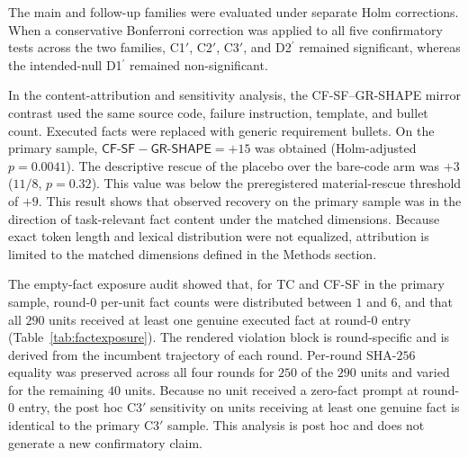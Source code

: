 \documentclass{article}
\numberwithin{equation}{section}  %
\newcommand{\fitwidth}[1]{\resizebox{\ifdim\width>\linewidth \linewidth\else\width\fi}{!}{#1}}
\theoremstyle{definition}
\newcommand{\armP}{\textsf{P}}
\newcommand{\armB}{\textsf{B}}
\newcommand{\armTC}{\textsf{TC}}
\newcommand{\armCF}{\textsf{CF-SF}}
\newcommand{\armGR}{\textsf{GR-SHAPE}}
\newcommand{\armBI}{\textsf{BI}}
\newcommand{\Cone}{C1$'$}
\newcommand{\Ctwo}{C2$'$}
\newcommand{\Cthree}{C3$'$}
\begin{document}
The main and follow-up families were evaluated under separate Holm corrections. When a
conservative Bonferroni correction was applied to all five confirmatory tests across the two
families, \Cone{}, \Ctwo{}, \Cthree{}, and D2$^{\prime}$ remained significant, whereas the
intended-null D1$^{\prime}$ remained non-significant.

\begin{table}[t]
\caption{Sixth-arm family on the same $n=290$ units. Pooled exact one-sided McNemar tests were
evaluated within a two-claim Holm family. \armBI{} generations are fresh, whereas \armB{} and
\armP{} outcomes are frozen from the main run. By construction, the net differences sum to
$+3+15=+18$.}
\label{tab:deconf}
\centering\footnotesize\setlength{\tabcolsep}{4pt}
\fitwidth{}
\end{table}

\label{sec:robustness}

In the content-attribution and sensitivity analysis, the \armCF{}--\armGR{} mirror contrast
used the same source code, failure instruction, template, and bullet count. Executed facts
were replaced with generic requirement bullets. On the primary sample,
$\armCF-\armGR=+15$ was obtained (Holm-adjusted $p=0.0041$). The descriptive rescue of the
placebo over the bare-code arm was $+3$ ($11/8$, $p=0.32$). This value was below the
preregistered material-rescue threshold of $+9$. This result shows that observed recovery on
the primary sample was in the direction of task-relevant fact content under the matched
dimensions. Because exact token length and lexical distribution were not equalized,
attribution is limited to the matched dimensions defined in the Methods section.

The empty-fact exposure audit showed that, for \armTC{} and \armCF{} in the primary sample,
round-$0$ per-unit fact counts were distributed between $1$ and $6$, and that all $290$ units
received at least one genuine executed fact at round-$0$ entry
(Table~\ref{tab:factexposure}). The rendered violation block is round-specific and is derived
from the incumbent trajectory of each round. Per-round SHA-$256$ equality was preserved across
all four rounds for $250$ of the $290$ units and varied for the remaining $40$ units. Because
no unit received a zero-fact prompt at round-$0$ entry, the post hoc \Cthree{} sensitivity on
units receiving at least one genuine fact is identical to the primary \Cthree{} sample. This
analysis is post hoc and does not generate a new confirmatory claim.
\end{document}
